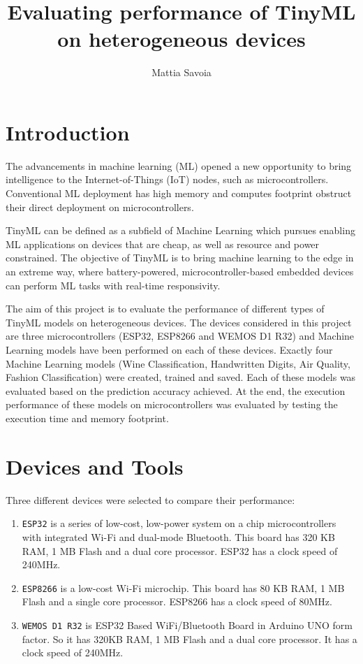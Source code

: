 \documentclass{article}
\title{Evaluating performance of TinyML on heterogeneous devices}
\author{Mattia Savoia}
\date{}
\begin{document}
\maketitle


\section{Introduction}
The advancements in machine learning (ML) opened a new opportunity to bring intelligence to the Internet-of-Things (IoT) nodes, such as microcontrollers. Conventional ML deployment has high memory and computes footprint obstruct their direct deployment on microcontrollers. 

TinyML can be defined as a subfield of Machine Learning which pursues enabling ML applications on devices that are cheap, as well as resource and power constrained. The objective of TinyML is to bring machine learning to the edge in an extreme way, where battery-powered, microcontroller-based embedded devices can perform ML tasks with real-time responsivity. 

The aim of this project is to evaluate the performance of different types of TinyML models on heterogeneous devices. The devices considered in this project are three microcontrollers (ESP32, ESP8266 and WEMOS D1 R32) and Machine Learning models have been performed on each of these devices. Exactly four Machine Learning models (Wine Classification, Handwritten Digits, Air Quality, Fashion Classification) were created, trained and saved. Each of these models was evaluated based on the prediction accuracy achieved.
At the end, the execution performance of these models on microcontrollers was evaluated by testing the execution time and memory footprint.

\section{Devices and Tools}
Three different devices were selected to compare their performance:
\begin{enumerate}
    \item \texttt{ESP32} is a series of low-cost, low-power system on a chip microcontrollers with integrated Wi-Fi and dual-mode Bluetooth. This board has 320 KB RAM, 1 MB Flash and a dual core processor. ESP32 has a clock speed of 240MHz.
    \item \texttt{ESP8266} is a low-cost Wi-Fi microchip. This board has 80 KB RAM, 1 MB Flash and a single core processor. ESP8266 has a clock speed of 80MHz.
    \item \texttt{WEMOS D1 R32} is ESP32 Based WiFi/Bluetooth Board in Arduino UNO form factor. So it has 320KB RAM, 1 MB Flash and a dual core processor. It has a clock speed of 240MHz. 
\end{enumerate}
\end{document}
